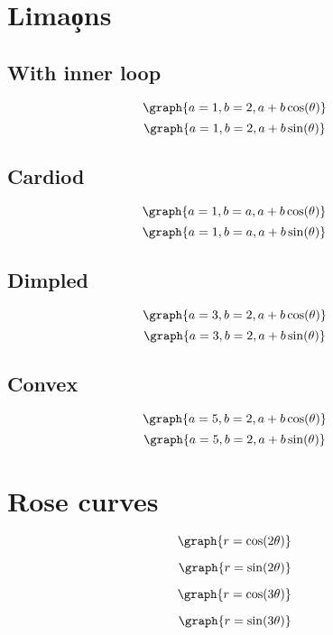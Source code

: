 \documentclass{ximera}
\begin{document}
\section{Lima\c ons}

\subsection{With inner loop}
\[
\graph{a=1,b=2,a+b \cos(\theta)}
\]
\[
\graph{a=1,b=2,a+b \sin(\theta)}
\]
\subsection{Cardiod}
\[
\graph{a=1,b=a,a+b \cos(\theta)}
\]
\[
\graph{a=1,b=a,a+b \sin(\theta)}
\]
\subsection{Dimpled}
\[
\graph{a=3,b=2,a+b \cos(\theta)}
\]
\[
\graph{a=3,b=2,a+b \sin(\theta)}
\]

\subsection{Convex}
\[
\graph{a=5,b=2,a+b \cos(\theta)}
\]
\[
\graph{a=5,b=2,a+b \sin(\theta)}
\]

\section{Rose curves}

\[
\graph{r=\cos(2\theta)}
\]

\[
\graph{r=\sin(2\theta)}
\]

\[
\graph{r=\cos(3\theta)}
\]

\[
\graph{r=\sin(3\theta)}
\]
\end{document}
